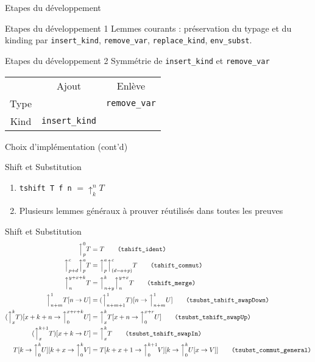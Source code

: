 \documentclass[10pt,xcolor={usenames,dvipsnames,svgnames,table}]{beamer}
\newcommand{\eqname}[1]{\tag*{#1}}
\begin{document}
  \begin{frame}{Etapes du développement}
  \begin{block}{Etapes du développement 1}
   Lemmes courants : préservation du typage et du kinding par {\tt insert\_kind}, {\tt remove\_var}, {\tt replace\_kind}, {\tt env\_subst}. 
  \end{block}
  \begin{block}{Etapes du développement 2}
   Symmétrie de {\tt insert\_kind} et {\tt remove\_var} 
  \end{block}
  \centering
  \begin{tabular}{c c c}
   & Ajout & Enlève \\ \cline{2-3}
   Type & \multicolumn{1}{|c|}{ } & \multicolumn{1}{c|}{{\tt remove\_var}} \\ \cline{2-3}
   Kind & \multicolumn{1}{|c|}{{\tt insert\_kind}} & \multicolumn{1}{c|}{ } \\ \cline{2-3}
  \end{tabular}
  \end{frame}
  
  \begin{frame}{Choix d'implémentation (cont'd)}
  \begin{block}{Shift et Substitution}
  \begin{enumerate}
   \item {\tt tshift T f n} $= \uparrow_k^n T$
   \item Plusieurs lemmes généraux à prouver réutilisés dans toutes les preuves
  \end{enumerate}
  \end{block}
  \end{frame}
  
  \begin{frame}{Shift et Substitution}
  \begin{align} 
  \Big\uparrow_p^0 T &= T \eqname{\texttt{(tshift\_ident)}} \\
  \Big\uparrow_{p+d}^c \Big\uparrow_p^a T &= \Big\uparrow_{p}^a \Big\uparrow_{(d-a+p)}^c T 
       \eqname{\texttt{(tshift\_commut)}} \\
      \Big\uparrow_{n}^{y+x+k} T &= \Big\uparrow_{n+y}^k \Big\uparrow_{n}^{y+x} T
       \eqname{\texttt{(tshift\_merge)}} \\
      \Big\uparrow_{n+m}^{1} T[n \rightarrow U] 
       &= (\Big\uparrow^{1}_{n+m+1} T)[n \rightarrow \Big\uparrow^{1}_{n+m} U]
       \eqname{\texttt{(tsubst\_tshift\_swapDown)}}\\
  (\Big\uparrow^k_x T) [x+k+n \rightarrow \Big\uparrow^{x+r+k}_0 U] 
  &= \Big\uparrow^k_x T[x+n \rightarrow \Big\uparrow^{x+r}_0 U]
       \eqname{\texttt{(tsubst\_tshift\_swapUp)}} \\
     (\Big\uparrow^{k+1}_x T)[x+k \rightarrow U] &= \Big\uparrow^k_x T
       \eqname{\texttt{(tsubst\_tshift\_swapIn)}} \\
      T[k \rightarrow \Big\uparrow^k_0 U][k+x \rightarrow \Big\uparrow^k_0 V] &=
       T[k+x+1 \rightarrow \Big\uparrow^{k+1}_0 V][k \rightarrow \Big\uparrow^k_0 U[x \rightarrow V]]
       \eqname{\texttt{(tsubst\_commut\_general)}} 
  \end{align}
  \end{frame}
\end{document}
